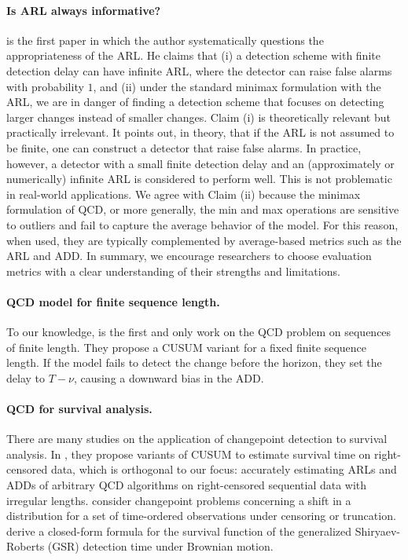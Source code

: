 \documentclass{article}
\theoremstyle{plain}
\theoremstyle{definition}
\theoremstyle{remark}
\begin{document}
\paragraph{Is ARL always informative?}
\citep{mei2008average} is the first paper in which the author systematically questions the appropriateness of the ARL.
He claims that 
(i) a detection scheme with finite detection delay can have infinite ARL, where the detector can raise false alarms with probability $1$,
and (ii) under the standard minimax formulation with the ARL, we are in danger of finding a detection scheme that focuses on detecting larger changes instead of smaller changes.
Claim (i) is theoretically relevant but practically irrelevant. It points out, in theory, that if the ARL is not assumed to be finite, one can construct a detector that raise false alarms. In practice, however, a detector with a small finite detection delay and an (approximately or numerically) infinite ARL is considered to perform well. This is not problematic in real-world applications.
We agree with Claim (ii) because the minimax formulation of QCD, or more generally, the min and max operations are sensitive to outliers and fail to capture the average behavior of the model. For this reason, when used, they are typically complemented by average-based metrics such as the ARL and ADD. 
In summary, we encourage researchers to choose evaluation metrics with a clear understanding of their strengths and limitations.


\paragraph{QCD model for finite sequence length.}
To our knowledge, \citep{huang2024high} is the first and only work on the QCD problem on sequences of finite length.
They propose a CUSUM variant for a fixed finite sequence length.
If the model fails to detect the change before the horizon, they set the delay to $T - \nu$, causing a downward bias in the ADD.


\paragraph{QCD for survival analysis.}
There are many studies on the application of changepoint detection to survival analysis.
In \citep{biswas2008risk, sego2009risk, gandy2010risk, phinikettos2014omnibus, gomon2024cgr, sasikumr2025comprehensive}, they propose variants of CUSUM to estimate survival time on right-censored data, which is orthogonal to our focus: accurately estimating ARLs and ADDs of arbitrary QCD algorithms on right-censored sequential data with irregular lengths.
\citet{gierz2020inference} consider changepoint problems concerning a shift in a distribution for a set of time-ordered observations under censoring or truncation.
\citet{polunchenko2016exact} derive a closed-form formula for the survival function of the generalized Shiryaev-Roberts (GSR) detection time under Brownian motion.
\end{document}
